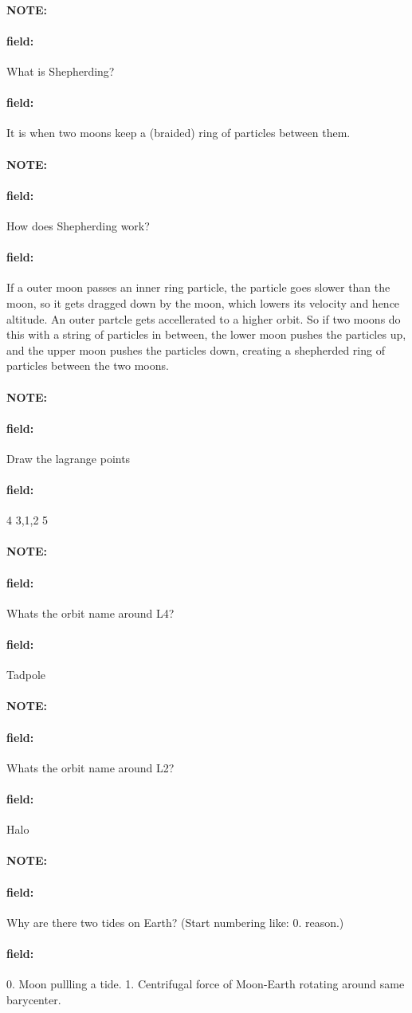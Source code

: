 \documentclass[12pt]{article}
\newenvironment{note}{\paragraph{NOTE:}}{}
\newenvironment{field}{\paragraph{field:}}{}
\begin{document}
\begin{note}
   \begin{field}
        What is Shepherding?
   \end{field}
   \begin{field}
		It is when two moons keep a (braided) ring of particles between them.
   \end{field}
\end{note}
\begin{note}
   \begin{field}
        How does Shepherding work?
   \end{field}
   \begin{field}
		If a outer moon passes an inner ring particle, the particle goes slower than the moon, so it gets dragged down by the moon, which lowers its velocity and hence altitude. An outer partcle gets accellerated to a higher orbit. So if two moons do this with a string of particles in between, the lower moon pushes the particles up, and the upper moon pushes the particles down, creating a shepherded ring of particles between the two moons.
   \end{field}
\end{note}
\begin{note}
   \begin{field}
        Draw the lagrange points
   \end{field}
   \begin{field}
   		   4
		3,1,2
		   5
   \end{field}
\end{note}
\begin{note}
   \begin{field}
        Whats the orbit name around L4?
   \end{field}
   \begin{field}
   		   Tadpole
   \end{field}
\end{note}
\begin{note}
   \begin{field}
        Whats the orbit name around L2?
   \end{field}
   \begin{field}
   		   Halo
   \end{field}
\end{note}
\begin{note}
   \begin{field}
        Why are there two tides on Earth? (Start numbering like: 0. reason.)
   \end{field}
   \begin{field}
		0. Moon pullling a tide.
		1. Centrifugal force of Moon-Earth rotating around same barycenter.
   \end{field}
\end{note}
\end{document}
